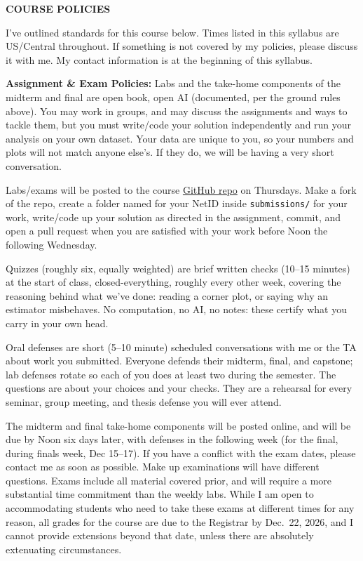 {\large \bf \headerfont \color{RoyalBlue} COURSE POLICIES}

I've outlined standards for this course below. Times listed in this
syllabus are US/Central throughout. If something is not covered by my policies,
please discuss it with me. My contact information is at the beginning of this
syllabus.\\
\medskip

{\bf \headerfont \color{RoyalBlue} Assignment \& Exam Policies:}
Labs and the take-home components of the midterm and final are open book, open
AI (documented, per the ground rules above). You may work in groups, and may
discuss the assignments and ways to tackle them, but you must write/code your
solution independently and run your analysis on your own dataset. Your data
are unique to you, so your numbers and plots will not match anyone else's. If
they do, we will be having a very short conversation.

Labs/exams will be posted to the course
\href{https://github.com/gnarayan/ast457_2026_Fall}{GitHub repo} on Thursdays.
Make a fork of the repo, create a folder named for your NetID inside
\texttt{submissions/} for your work, write/code up your solution as directed
in the assignment, commit, and open a pull request when you are satisfied
with your work before Noon the following Wednesday.

Quizzes (roughly six, equally weighted) are brief written checks (10--15 minutes) at the start of class, closed-everything, roughly every other week, covering the reasoning behind what we've done: reading a corner plot, or saying why an estimator misbehaves. No computation, no AI, no notes: these certify what you carry in your own head.

Oral defenses are short (5--10 minute) scheduled conversations with me or the
TA about work you submitted. Everyone defends their midterm, final, and capstone; lab defenses rotate so each of you does at least two during the semester. The questions are about your
choices and your checks. They are a rehearsal for every seminar, group meeting, and thesis defense you will ever attend.

The midterm and final take-home components will be posted online, and will be
due by Noon six days later, with defenses in the following week (for the
final, during finals week, Dec 15--17). If you have a
conflict with the exam dates, please contact me as soon as possible. Make up
examinations will have different questions. Exams include all material covered
prior, and will require a more substantial time commitment than the weekly
labs. While I am open to accommodating students who need to take these exams at different times for any reason, all grades for the course are due to
the Registrar by Dec.~22, 2026, and I cannot provide extensions beyond that
date, unless there are absolutely extenuating circumstances.
\medskip

